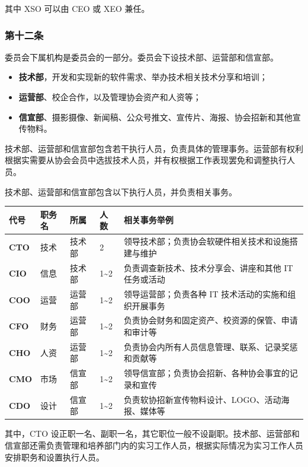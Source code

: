 \documentclass[
]{ctexart}
\begin{document}
其中 XSO 可以由 CEO 或 XEO 兼任。

\hypertarget{ux7b2cux5341ux4e8cux6761-ux59d4ux5458ux4f1aux4e0bux5c5eux673aux6784}{%
\subsubsection{第十二条}\label{ux7b2cux5341ux4e8cux6761-ux59d4ux5458ux4f1aux4e0bux5c5eux673aux6784}}

委员会下属机构是委员会的一部分。委员会下设技术部、运营部和信宣部。

\begin{itemize}
    \item \textbf{技术部}，开发和实现新的软件需求、举办技术相关技术分享和培训；
    \item \textbf{运营部}、校企合作，以及管理协会资产和人资等；
    \item \textbf{信宣部}、摄影摄像、新闻稿、公众号推文、宣传片、海报、协会招新和其他宣传物料。
\end{itemize}

技术部、运营部和信宣部包含若干执行人员，负责具体的管理事务。运营部有权利根据实需要从协会会员中选拔技术人员，并有权根据工作表现罢免和调整执行人员。

技术部、运营部和信宣部包含以下执行人员，并负责相关事务。

{
\footnotesize
\begin{longtable}[]{@{}lllll@{}}
\toprule()
\textbf{代号} & \textbf{职务名} & \textbf{所属} & \textbf{人数} & \textbf{相关事务举例} \\
\midrule()
\endhead
\textbf{CTO} & 技术 & 技术部 & 2 &
领导技术部；负责协会软硬件相关技术和设施搭建与维护 \\
\textbf{CIO} & 信息 & 技术部 & 1\textasciitilde 2 &
负责调查新技术、技术分享会、讲座和其他 IT 任务或活动 \\
\textbf{COO} & 运营 & 运营部 & 1\textasciitilde 2 & 领导运营部；负责各种 IT
技术活动的实施和组织开展事务 \\
\textbf{CFO} & 财务 & 运营部 & 1\textasciitilde 2 &
负责协会财务和固定资产、校资源的保管、申请和审计等 \\
\textbf{CHO} & 人资 & 运营部 & 1\textasciitilde 2 &
负责协会内所有人员信息管理、联系、记录奖惩和贡献等 \\
\textbf{CMO} & 市场 & 信宣部 & 1\textasciitilde 2 &
领导信宣部；负责协会招新、各种协会事宜的记录和宣传 \\
\textbf{CDO} & 设计 & 信宣部 & 1\textasciitilde 2 &
负责软协招新宣传物料设计、LOGO、活动海报、媒体等 \\
\bottomrule()
\end{longtable}
}
其中，CTO
设正职一名、副职一名，其它职位一般不设副职。技术部、运营部和信宣部还需负责管理和培养部门内的实习工作人员，根据实际情况为实习工作人员安排职务和设置执行人员。
\end{document}

